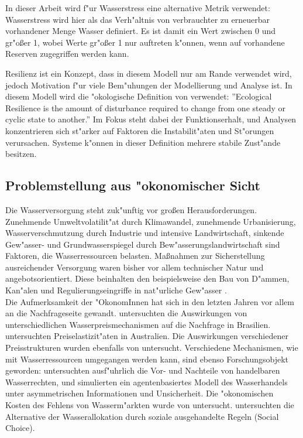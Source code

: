 \documentclass[11pt,a4paper]{article}
\begin{document}
In dieser Arbeit wird f"ur Wasserstress eine alternative Metrik verwendet: Wasserstress wird hier als das Verh"altnis von verbrauchter zu erneuerbar vorhandener Menge Wasser definiert. Es ist damit ein Wert zwischen 0 und gr"oßer 1, wobei Werte gr"oßer 1 nur auftreten k"onnen, wenn auf vorhandene Reserven zugegriffen werden kann.

Resilienz ist ein Konzept, dass in diesem Modell nur am Rande verwendet wird, jedoch Motivation f"ur viele Bem"uhungen der Modellierung und Analyse ist. In diesem Modell wird die "okologische Definition von \cite{Hawes2006} verwendet: ''Ecological Resilience is the amount of disturbance required to change from one
steady or cyclic state to another.'' Im Fokus steht dabei der Funktionserhalt, und Analysen konzentrieren sich st"arker auf Faktoren die Instabilit"aten und St"orungen verursachen. Systeme k"onnen in dieser Definition mehrere stabile Zust"ande besitzen.


\subsection{Problemstellung aus "okonomischer Sicht}

Die Wasserversorgung steht zuk"unftig vor großen Herausforderungen. Zunehmende Umweltvolatilit"at durch Klimawandel, zunehmende Urbanisierung, Wasserverschmutzung durch Industrie und intensive Landwirtschaft, sinkende Gew"asser- und Grundwasserspiegel durch Bew"as\-serungs\-land\-wirt\-schaft sind Faktoren, die Wasserressourcen belasten. Maßnahmen zur Sicherstellung ausreichender Versorgung waren bisher vor allem technischer Natur und angebotsorientiert. Diese beinhalten den beispielsweise den Bau von D"ammen, Kan"alen und Regulierungseingriffe in nat"urliche Gew"asser \citep{Olmstead2010}.\\

Die Aufmerksamkeit der "OkonomInnen hat sich in den letzten Jahren vor allem an die Nachfrageseite gewandt. \cite{Ruijs2008} untersuchten die Auswirkungen von unterschiedlichen Wasserpreismechanismen auf die Nachfrage in Brasilien. \cite{Wheeler2008} untersuchten Preiselastizit"aten in Australien. Die Auswirkungen verschiedener Preisstrukturen wurden ebenfalls von \citep{Olmstead2007} untersucht. Verschiedene Mechanismen, wie mit Wasserressourcen umgegangen werden kann, sind ebenso Forschungsobjekt geworden: \cite{Chong2006b} untersuchten ausf"uhrlich die Vor- und Nachteile von handelbaren Wasserrechten, und \cite{Nguyen2013} simulierten ein agentenbasiertes Modell des Wasserhandels unter asymmetrischen Informationen und Unsicherheit. Die "okonomischen Kosten des Fehlens von Wasserm"arkten wurde von \cite{Brennan2008} untersucht. \cite{Goetz2008} untersuchten die Alternative der Wasserallokation durch soziale ausgehandelte Regeln (Social Choice).\\
\end{document}

